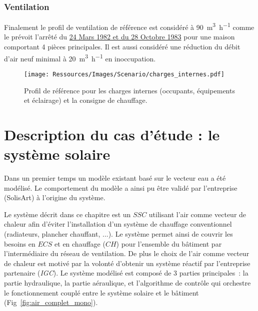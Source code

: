 \subsubsection{Ventilation} %
\label{ssub:ventilation_ref}
Finalement le profil de ventilation de référence est considéré à \SI[per-mode=symbol]{90}{\meter\cubed\per\hour}
comme le prévoit l’arrêté du \href{https://www.legifrance.gouv.fr/affichTexte.do?cidTexte=JORFTEXT000000862344}{24 Mars
1982 et du 28 Octobre 1983} pour une maison comportant 4 pièces principales. Il est aussi
considéré une réduction du débit d’air neuf minimal à \SI[per-mode=symbol]{20}{\meter\cubed\per\hour}
en inoccupation.

\begin{figure}
    \begin{center}
        \texttt{[image: Ressources/Images/Scenario/charges\_internes.pdf]}
    \end{center}
    \caption{Profil de référence pour les charges internes (occupants, équipements et éclairage)
             et la consigne de chauffage.
             \label{fig:scenario_reference}}
\end{figure}




\section{Description du cas d’étude : le système solaire} %
\label{sec:description_du_cas_d_etude_le_systeme_solaire}
Dans un premier temps un modèle existant basé sur le vecteur eau a été modélisé.
Le comportement du modèle a ainsi pu être validé par l’entreprise (SolisArt) à
l’origine du système.

Le système décrit dans ce chapitre est un $SSC$ utilisant l’air comme vecteur de chaleur
afin d’éviter l’installation d’un système de chauffage conventionnel (radiateurs, plancher chauffant, ...). Le
système permet ainsi de couvrir les besoins en $ECS$ et en chauffage ($CH$) pour l’ensemble du
bâtiment par l’intermédiaire du réseau de ventilation. De plus le choix de l’air comme
vecteur de chaleur est motivé par la volonté d’obtenir un système réactif par l’entreprise partenaire (\emph{IGC}).
Le système modélisé est composé de 3 parties principales~: la partie
hydraulique, la partie aéraulique, et l’algorithme de contrôle qui orchestre le fonctionnement
couplé entre le système solaire et le bâtiment (Fig~\ref{fig:air_complet_mono}).

